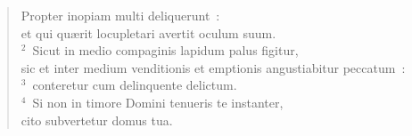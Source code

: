 \begin{flushleft}\begin{verse}\vspace{-19pt}\hspace{6pt}Propter inopiam multi deliquerunt~:\\\hspace{6pt} et qui qu\ae rit locupletari avertit oculum suum.\\
${}^{2}$~Sicut in medio compaginis lapidum palus figitur,\\ sic et inter medium venditionis et emptionis angustiabitur peccatum~:\\
${}^{3}$~conteretur cum delinquente delictum.\\
${}^{4}$~Si non in timore Domini tenueris te instanter,\\ cito subvertetur domus tua.\end{verse}\end{flushleft}


